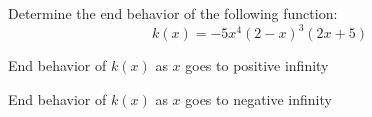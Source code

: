 \documentclass{ximera}
\author{David Kish}
\begin{document}
Determine the end behavior of the following function:
\[
k(x)=-5x^4(2-x)^3(2x+5)
\]
\begin{exercise}
End behavior of $k(x)$ as $x$ goes to positive infinity
\begin{multipleChoice}
\end{multipleChoice}
\end{exercise}
\begin{exercise}
End behavior of $k(x)$ as $x$ goes to negative infinity
\begin{multipleChoice}
\end{multipleChoice}
\end{exercise}
\end{document}
